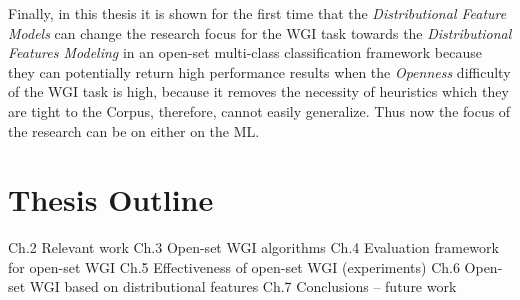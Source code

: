 Finally, in this thesis it is shown for the first time that the \textit{Distributional Feature Models} can change the research focus for the WGI task towards the \textit{Distributional Features Modeling} in an open-set multi-class classification framework because they can potentially return high performance results when the \textit{Openness} difficulty of the WGI task is high, because it removes the necessity of heuristics which they are tight to the Corpus, therefore, cannot easily generalize. Thus now the focus of the research can be on either on the ML. 


\section{Thesis Outline} \label{chap:Introduction:sec:thesis_outline}

Ch.2 Relevant work
Ch.3 Open-set WGI algorithms
Ch.4 Evaluation framework for open-set WGI
Ch.5 Effectiveness of open-set WGI (experiments)
Ch.6 Open-set WGI based on distributional features
Ch.7 Conclusions – future work


